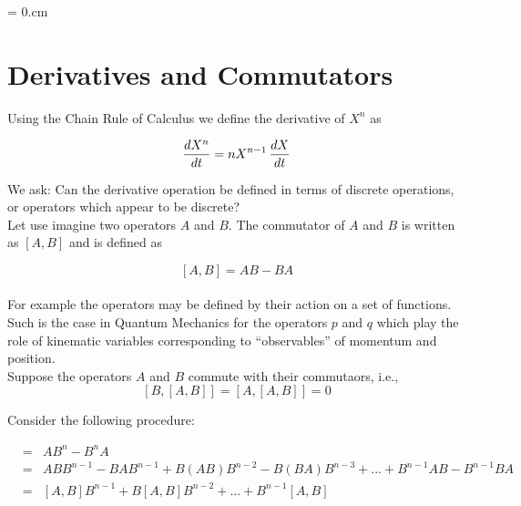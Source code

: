 \newcommand{\Tr}{{\rm Tr}}


\parindent = 0.cm
\vglue 0.3cm
\rightskip=3pc
\leftskip=3pc
\twelverm


\section{Derivatives and Commutators}

Using the Chain Rule of Calculus we define the derivative of $X^n$ as

$${dX^n\over dt} = nX^{n-1}\, {dX\over dt}$$

We ask: Can the derivative operation be defined in terms of discrete operations, or operators which appear to be discrete?\\

Let use imagine two operators $A$ and $B$. The commutator of $A$ and $B$ is written as  $[A,B]$ and is defined as 

$$\left[A,B\right] = AB - BA$$\\

For example the operators may be defined by their action on a set of functions. Such is the case in Quantum Mechanics for the operators $p$ and $q$ which play the role of kinematic variables corresponding to ``observables'' of momentum and position.\\

Suppose the operators $A$ and $B$ commute with their commutaors, i.e., $$[B, [A,B]] = [A, [A,B]] = 0$$

Consider the following procedure: 

\begin{eqnarray*}
[A,B^n] &=& AB^n - B^nA \\
             &=& ABB^{n-1} - BAB^{n-1}  +  B(AB)B^{n-2} - B(BA)B^{n-3} + ... + B^{n-1}AB - B^{n-1}BA\\
             &=& [A,B] B^{n-1} + B[A,B]B^{n-2} +  ... + B^{n-1}[A,B]\\
\end{eqnarray*}

